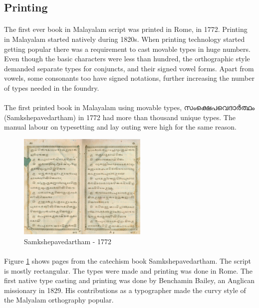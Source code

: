 \documentclass[10pt]{article}
\begin{document}
\subsection{Printing}

\paragraph{}
The first ever book in Malayalam script was printed in Rome, in 1772. Printing in Malayalam started natively during 1820s\cite{babucherian}. When printing technology started getting popular there was a requirement to cast movable types in huge numbers. Even though the basic characters were less than hundred, the orthographic style demanded separate types for conjuncts, and their signed vowel forms. Apart from vowels, some consonants too have signed notations, further increasing the number of types needed in the foundry. 

\paragraph{}
The first printed book in Malayalam using movable types, {\manjari സംക്ഷെപവെദാർത്ഥം} (Samkshepavedartham) in 1772 had more than thousand unique types\cite{babucherian}. The manual labour on typesetting and lay outing were high for the same reason. 

\begin{figure}
 \centering
  \includegraphics[width=0.55\textwidth]{images/samkshepavedartham1772.png}
   \caption{Samkshepavedartham - 1772}
	\label{Samkshepam}
\end{figure}

\paragraph{}
Figure \ref{Samkshepam} shows pages from the catechism book Samkshepavedartham. The script is mostly rectangular. The types were made and printing was done in Rome. The first native type casting and printing was done by Benchamin Bailey, an Anglican missionary in 1829.  His contributions as a typographer made the curvy style of the Malyalam orthography popular\cite{gupthannair}.
\end{document}
